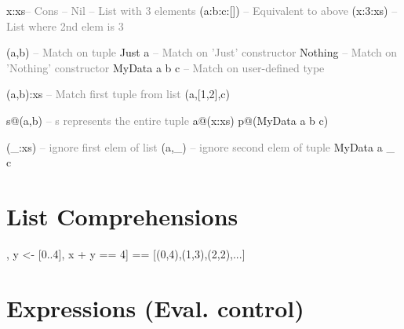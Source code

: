 \documentclass{refcard}
\begin{document}
\begin{ldesc}
    \li[Lists] 
        x:xs\s\textcolor{gray}{-- Cons} \li[]
        [] \textcolor{gray}{-- Nil} \li[]
        [a,b,c] \textcolor{gray}{-- List with 3 elements} \li
        (a:b:c:[]) \textcolor{gray}{-- Equivalent to above} \li
        (x:3:xs) \textcolor{gray}{-- List where 2nd elem is 3} \li

        (a,b) \textcolor{gray}{-- Match on tuple}\li
        Just a \textcolor{gray}{-- Match on 'Just' constructor} \li
        Nothing \textcolor{gray}{-- Match on 'Nothing' constructor} \li
        MyData a b c \textcolor{gray}{-- Match on user-defined type} \li

        (a,b):xs \textcolor{gray}{-- Match first tuple from list} \li
        (a,[1,2],c) \li

    \li[As-pattern]
        s@(a,b) \textcolor{gray}{-- s represents the entire tuple} \li
        a@(x:xs) \li
        p@(MyData a b c) \li

    \li[Wildcard]
        (\_:xs) \textcolor{gray}{-- ignore first elem of list} \li
        (a,\_)  \textcolor{gray}{-- ignore second elem of tuple} \li
        MyData a \_ c \li
\end{ldesc}


\section{List Comprehensions}

\begin{ldesc}
	\li[pairs where sum=4] [(x,y) | \li
	                       \s\s{}x <- [0..4], \li
						   \s\s{}y <- [0..4], \li
						   \s\s{}x + y == 4] \li
	                       == [(0,4),(1,3),(2,2),...]
\end{ldesc}


\section{Expressions (Eval. control)}
\end{document}
